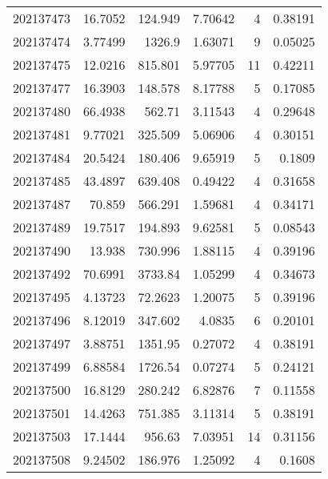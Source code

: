 \begin{tabular}{rrrrrr}
 202137473 &         16.7052  &      124.949  &            7.70642 &           4 & 0.38191 \\
 202137474 &          3.77499 &     1326.9    &            1.63071 &           9 & 0.05025 \\
 202137475 &         12.0216  &      815.801  &            5.97705 &          11 & 0.42211 \\
 202137477 &         16.3903  &      148.578  &            8.17788 &           5 & 0.17085 \\
 202137480 &         66.4938  &      562.71   &            3.11543 &           4 & 0.29648 \\
 202137481 &          9.77021 &      325.509  &            5.06906 &           4 & 0.30151 \\
 202137484 &         20.5424  &      180.406  &            9.65919 &           5 & 0.1809  \\
 202137485 &         43.4897  &      639.408  &            0.49422 &           4 & 0.31658 \\
 202137487 &         70.859   &      566.291  &            1.59681 &           4 & 0.34171 \\
 202137489 &         19.7517  &      194.893  &            9.62581 &           5 & 0.08543 \\
 202137490 &         13.938   &      730.996  &            1.88115 &           4 & 0.39196 \\
 202137492 &         70.6991  &     3733.84   &            1.05299 &           4 & 0.34673 \\
 202137495 &          4.13723 &       72.2623 &            1.20075 &           5 & 0.39196 \\
 202137496 &          8.12019 &      347.602  &            4.0835  &           6 & 0.20101 \\
 202137497 &          3.88751 &     1351.95   &            0.27072 &           4 & 0.38191 \\
 202137499 &          6.88584 &     1726.54   &            0.07274 &           5 & 0.24121 \\
 202137500 &         16.8129  &      280.242  &            6.82876 &           7 & 0.11558 \\
 202137501 &         14.4263  &      751.385  &            3.11314 &           5 & 0.38191 \\
 202137503 &         17.1444  &      956.63   &            7.03951 &          14 & 0.31156 \\
 202137508 &          9.24502 &      186.976  &            1.25092 &           4 & 0.1608  \\

\end{tabular}

